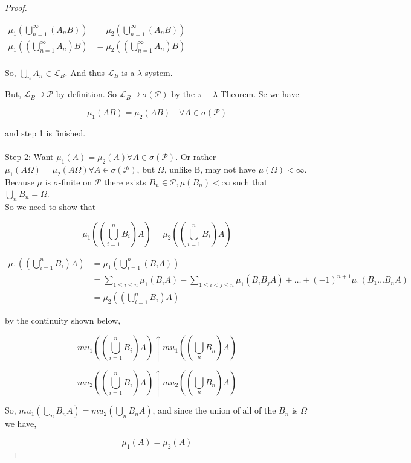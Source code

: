 \documentclass[11pt,fleqn]{book} %
\begin{document}
\begin{proof}
\begin{enumerate}
					$\begin{aligned}
						\mu_1 \left( \bigcup^\infty_{n=1} (A_n B) \right) &= \mu_2 \left( \bigcup^\infty_{n=1} (A_n B) \right)\\
						\mu_1 \left((\bigcup^\infty_{n=1} A_n) B \right) &= \mu_2 \left( (\bigcup^\infty_{n=1} A_n) B \right)\\
					\end{aligned}$

				So, $\bigcup_n A_n \in \mathcal{L}_B$. And thus $\mathcal{L}_B$ is a $\lambda$-system. 


			\end{enumerate}

			But, $\mathcal{L}_B \supseteq \mathcal{P}$ by definition. So $\mathcal{L}_B
\supseteq \sigma(\mathcal{P})$ by the $\pi-\lambda$ Theorem. Se we have 

			$$\mu_1(AB) = \mu_2(AB) \quad \forall A \in \sigma(\mathcal{P})$$

			and step 1 is finished. \\
			\\

	Step 2: Want $\mu_1 (A) = \mu_2(A) \forall A \in \sigma(\mathcal{P})$. Or rather $\mu_1 (A\Omega) = \mu_2(A\Omega) \forall A \in \sigma(\mathcal{P})$, but $\Omega$, unlike B, may not have $\mu(\Omega) < \infty$. \\

	Because $\mu$ is $\sigma$-finite on $\mathcal{P}$ there exists $B_n \in \mathcal{P}, \mu(B_n) < \infty$ such that $\bigcup_n B_n = \Omega$.\\

	So we need to show that 

			$$ \mu_1 \left((\bigcup^n_{i=1} B_i) A \right) = \mu_2 \left( (\bigcup^n_{i=1} B_i) A \right)$$

	$\begin{aligned}
		 \mu_1 \left((\bigcup^n_{i=1} B_i) A \right) &= \mu_1 (\bigcup_{i=1}^n (B_i A))\\
		 	&= \displaystyle \sum_{1 \leq i \leq n} \mu_1(B_i A) - \displaystyle \sum_{1 \leq i <  j \leq n} \mu_1(B_i B_j A) + \dots + (-1)^{n+1}  \mu_1(B_1\dots B_n A)\\
		 		&= \mu_2((\bigcup^n_{i=1} B_i) A)
	\end{aligned}$

		by the continuity shown below, 

		$$mu_1((\bigcup^n_{i=1} B_i) A) \uparrow mu_1((\bigcup_n B_n) A) $$

		$$ mu_2((\bigcup^n_{i=1} B_i) A) \uparrow mu_2((\bigcup_n B_n) A)$$

	So, $mu_1(\bigcup_n B_n A) = mu_2(\bigcup_n B_n A)$, and since the union of all of the $B_n$ is $\Omega$ we have,

			$$\mu_1(A) = \mu_2(A) $$



\end{proof}
\end{document}
